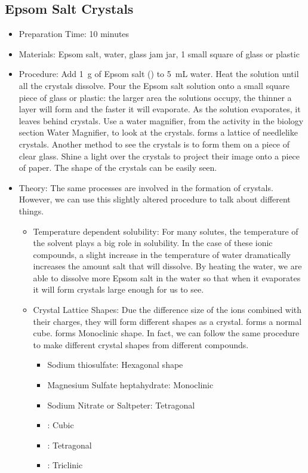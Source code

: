 \subsection{Epsom Salt Crystals}
\begin{itemize}
\item{Preparation Time: 10 minutes}
\item{Materials: Epsom salt, water, glass jam jar, 1 small square of glass or plastic}
\item{Procedure: Add 1~g of Epsom salt () to 5~mL water. Heat the solution until all the crystals dissolve. Pour the Epsom salt solution onto a small square piece of glass or plastic: the larger area the solutions occupy, the thinner a layer will form and the faster it will evaporate. As the solution evaporates, it leaves behind crystals. Use a water magnifier, from the activity in the biology section Water Magnifier, to look at the crystals.  forms a lattice of needlelike crystals. Another method to see the crystals is to form them on a piece of clear glass. Shine a light over the crystals to project their image onto a piece of paper. The shape of the crystals can be easily seen.}
\item{Theory: The same processes are involved in the formation of  crystals. However, we can use this slightly altered procedure to talk about different things.}
\begin{itemize}
\item{Temperature dependent solubility: For many solutes, the temperature of the solvent plays a big role in solubility. In the case of these ionic compounds, a slight increase in the temperature of water dramatically increases the amount salt that will dissolve. By heating the water, we are able to dissolve more Epsom salt in the water so that when it evaporates it will form crystals large enough for us to see.}
\item{Crystal Lattice Shapes: Due the difference size of the ions combined with their charges, they will form different shapes as a crystal.  forms a normal cube.  forms Monoclinic shape. In fact, we can follow the same procedure to make different crystal shapes from different compounds.}
\begin{itemize}
\item{Sodium thiosulfate: Hexagonal shape}
\item{Magnesium Sulfate heptahydrate: Monoclinic}
\item{Sodium Nitrate or Saltpeter: Tetragonal}
\item{: Cubic}
\item{: Tetragonal}
\item{: Triclinic}
\end{itemize}
\end{itemize}
\end{itemize}


